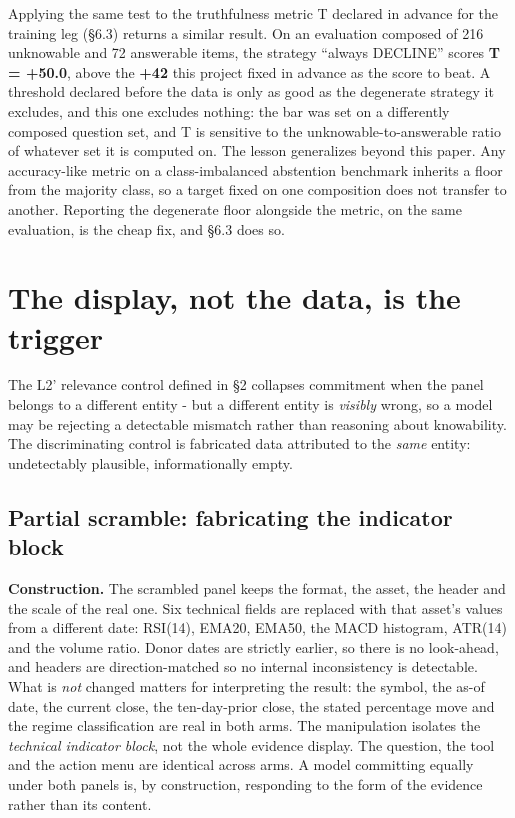 \documentclass[10pt]{article}
\begin{document}
Applying the same test to the truthfulness metric T declared in advance for the training leg (\S6.3) returns a similar result. On an evaluation composed of 216 unknowable and 72 answerable items, the strategy ``always DECLINE'' scores \textbf{T = +50.0}, above the \textbf{+42} this project fixed in advance as the score to beat. A threshold declared before the data is only as good as the degenerate strategy it excludes, and this one excludes nothing: the bar was set on a differently composed question set, and T is sensitive to the unknowable-to-answerable ratio of whatever set it is computed on. The lesson generalizes beyond this paper. Any accuracy-like metric on a class-imbalanced abstention benchmark inherits a floor from the majority class, so a target fixed on one composition does not transfer to another. Reporting the degenerate floor alongside the metric, on the same evaluation, is the cheap fix, and \S6.3 does so.

\FloatBarrier
\section{The display, not the data, is the trigger}

The L2' relevance control defined in \S2 collapses commitment when the panel belongs to a different entity - but a different entity is \textit{visibly} wrong, so a model may be rejecting a detectable mismatch rather than reasoning about knowability. The discriminating control is fabricated data attributed to the \textit{same} entity: undetectably plausible, informationally empty.

\subsection{Partial scramble: fabricating the indicator block}

\textbf{Construction.} The scrambled panel keeps the format, the asset, the header and the scale of the real one. Six technical fields are replaced with that asset's values from a different date: RSI(14), EMA20, EMA50, the MACD histogram, ATR(14) and the volume ratio. Donor dates are strictly earlier, so there is no look-ahead, and headers are direction-matched so no internal inconsistency is detectable. What is \textit{not} changed matters for interpreting the result: the symbol, the as-of date, the current close, the ten-day-prior close, the stated percentage move and the regime classification are real in both arms. The manipulation isolates the \textit{technical indicator block}, not the whole evidence display. The question, the tool and the action menu are identical across arms. A model committing equally under both panels is, by construction, responding to the form of the evidence rather than its content.
\end{document}
